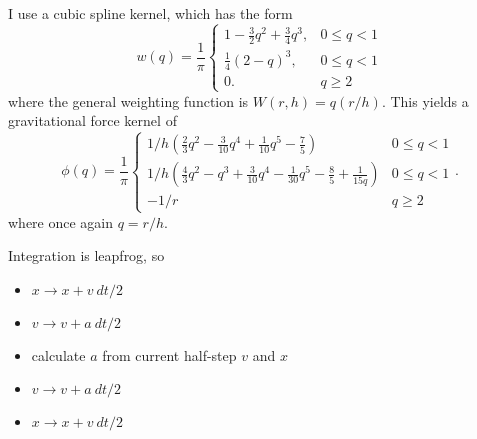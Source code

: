 \documentclass[12pt]{article}
\begin{document}
I use a cubic spline kernel, which has the form
\begin{equation}
    w(q) = \frac{1}{\pi}
    \begin{cases}
        1-\frac{3}{2} q^2 + \frac{3}{4} q^3, &  0 \leq q < 1 \\
        \frac{1}{4} (2-q)^3, &  0 \leq q < 1 \\
        0. & q \geq 2
    \end{cases}
\end{equation}
where the general weighting function is $W(r, h) = q(r/h)$. This yields a gravitational force kernel of 
\begin{equation}
    \phi(q) = \frac{1}{\pi}
    \begin{cases}
        1/h (\frac{2}{3}q^2 - \frac{3}{10}q^4 + \frac{1}{10}q^5 - \frac{7}{5} ) & 0 \leq q < 1 \\
        1/h (\frac{4}{3}q^2 - q^3 + \frac{3}{10}q^4 - \frac{1}{30}q^5 - \frac{8}{5}  + \frac{1}{15q}) & 0 \leq q < 1 \\
        -1/r & q \geq 2
    \end{cases}.
\end{equation}
where once again $q=r/h$. 


Integration is leapfrog, so 
\begin{itemize}
    \item $x \to x + v~dt/2$
    \item $v \to v + a~dt/2$
    \item calculate $a$ from current half-step $v$ and $x$
    \item $v \to v + a~dt/2$
    \item $x \to x + v~dt/2$
\end{itemize}



\newpage


\end{document}
